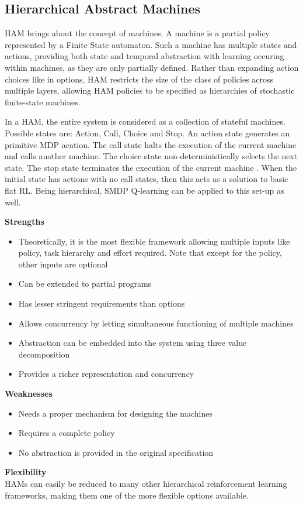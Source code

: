 \subsection{Hierarchical Abstract Machines}

HAM brings about the concept of machines. A machine is a partial policy
represented by a Finite State automaton. Such a machine has multiple states
and actions, providing both state and temporal abstraction with learning occuring
within machines, as they are only partially defined. Rather than expanding
action choices like in options, HAM restricts the size of
the class of policies across multiple layers, allowing HAM policies
to be specified as  hierarchies of stochastic finite-state machines.

In a HAM, the entire system is considered as a collection of stateful machines.
Possible states are: Action, Call, Choice and Stop. An action state generates
an primitive MDP acation. The call state halts the
execution of the current machine and calls another
machine. The choice state non-deterministically selects the next state. The
stop state terminates the execution of the current machine \cite{Parr}. When
the initial state has actions with no
call states, then this acts as a solution to basic flat RL. Being
hierarchical, SMDP Q-learning can be applied to this set-up as well.

\textbf{Strengths}
\begin{itemize}
    \item Theoretically, it is the most flexible framework allowing multiple inputs like policy, task hierarchy and effort required. Note that except for the policy, other inputs are optional
    \item Can be extended to partial programs
    \item Has lesser stringent requirements than options
    \item Allows concurrency by letting simultaneous functioning of multiple machines
    \item Abstraction can be embedded into the system using three value decomposition
    \item Provides a richer representation and concurrency
\end{itemize}

\textbf{Weaknesses}
\begin{itemize}
    \item Needs a proper mechanism for designing the machines
    \item Requires a complete policy
    \item No abstraction is provided in the original specification
\end{itemize}

\textbf{Flexibility}\\
HAMs can easily be reduced to many other hierarchical reinforcement learning
frameworks, making them one of the more flexible options available.
